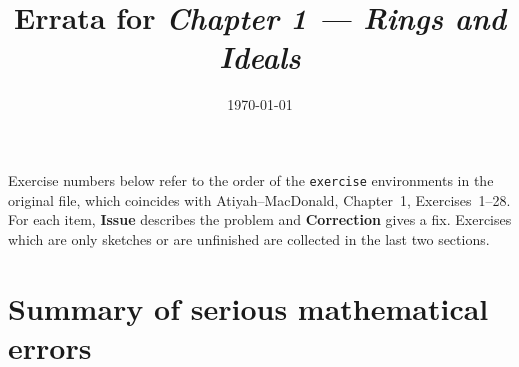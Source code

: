 \documentclass[11pt]{article}
\title{Errata for \emph{Chapter 1 --- Rings and Ideals}}
\author{}
\date{\today}
\begin{document}
\maketitle

\noindent
Exercise numbers below refer to the order of the \texttt{exercise} environments
in the original file, which coincides with Atiyah--MacDonald, Chapter~1,
Exercises~1--28.  For each item, \textbf{Issue} describes the problem and
\textbf{Correction} gives a fix.  Exercises which are only sketches or are
unfinished are collected in the last two sections.

\section*{Summary of serious mathematical errors}
\end{document}
